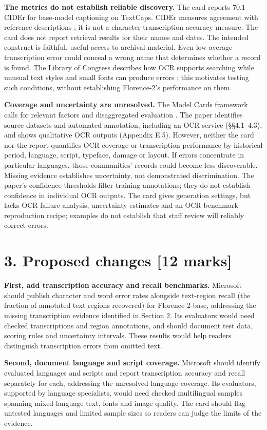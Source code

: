 \documentclass[11pt,letterpaper]{article}
\begin{document}
\textbf{The metrics do not establish reliable discovery.} The card reports 70.1 CIDEr for base-model captioning on TextCaps. CIDEr measures agreement with reference descriptions \citep{vedantam2015}; it is not a character-transcription accuracy measure. The card does not report retrieval results for their names and dates. The intended construct is faithful, useful access to archival material. Even low average transcription error could conceal a wrong name that determines whether a record is found. The Library of Congress describes how OCR supports searching while unusual text styles and small fonts can produce errors \citep{locOCR}; this motivates testing such conditions, without establishing Florence-2's performance on them.

\newpage
\textbf{Coverage and uncertainty are unresolved.} The Model Cards framework calls for relevant factors and disaggregated evaluation \citep[\S\S4.3, 4.7]{mitchell2019}. The paper identifies source datasets and automated annotation, including an OCR service (\S\S4.1--4.3), and shows qualitative OCR outputs (Appendix E.5). However, neither the card nor the report quantifies OCR coverage or transcription performance by historical period, language, script, typeface, damage or layout. If errors concentrate in particular languages, those communities' records could become less discoverable. Missing evidence establishes uncertainty, not demonstrated discrimination. The paper's confidence thresholds filter training annotations; they do not establish confidence in individual OCR outputs. The card gives generation settings, but lacks OCR failure analysis, uncertainty estimates and an OCR benchmark reproduction recipe; examples do not establish that staff review will reliably correct errors.

\section*{3. Proposed changes [12 marks]}
\textbf{First, add transcription accuracy and recall benchmarks.} Microsoft should publish character and word error rates alongside text-region recall (the fraction of annotated text regions recovered) for Florence-2-base, addressing the missing transcription evidence identified in Section 2. Its evaluators would need checked transcriptions and region annotations, and should document test data, scoring rules and uncertainty intervals. These results would help readers distinguish transcription errors from omitted text.

\textbf{Second, document language and script coverage.} Microsoft should identify evaluated languages and scripts and report transcription accuracy and recall separately for each, addressing the unresolved language coverage. Its evaluators, supported by language specialists, would need checked multilingual samples spanning mixed-language text, fonts and image quality. The card should flag untested languages and limited sample sizes so readers can judge the limits of the evidence.
\end{document}
